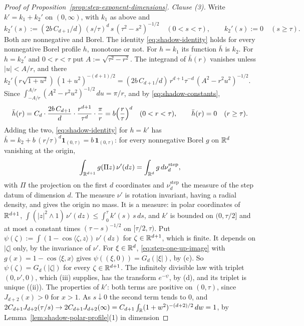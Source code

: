 \begin{proof}[Proof of Proposition~\ref{prop:step-exponent-dimensions}]
\emph{Clause (3).} Write $k' = k_1 + k_2'$ on $(0,\infty)$, with $k_1$ as above and
\[
  k_2'(s) := (2b\,C_{d+1}/d)\,(s/\tau)^d\,s\,(\tau^2 - s^2)^{-1/2} \quad (0 < s < \tau), \qquad
  k_2'(s) := 0 \quad (s \ge \tau) .
\]
Both are nonnegative and Borel. The identity
\ref{eq:shadow-identity} holds for every nonnegative Borel profile $h$, monotone or not. For
$h = k_1$ its function $\bar h$ is $k_2$. For $h = k_2'$ and $0 < r < \tau$ put
$A := \sqrt{\tau^2 - r^2}$. The integrand of $\bar h(r)$ vanishes unless $|u| < A/r$, and there
$k_2'(r\sqrt{1+u^2})\,(1+u^2)^{-(d+1)/2} = (2b\,C_{d+1}/d)\,r^{d+1}\tau^{-d}\,(A^2 - r^2u^2)^{-1/2}$.
Since $\int_{-A/r}^{A/r}(A^2 - r^2u^2)^{-1/2}\,du = \pi/r$, and by \ref{eq:shadow-constants},
\[
  \bar h(r) = C_d\cdot\frac{2b\,C_{d+1}}{d}\cdot\frac{r^{d+1}}{\tau^{d}}\cdot\frac{\pi}{r}
            = b\Bigl(\frac{r}{\tau}\Bigr)^{d} \quad (0 < r < \tau), \qquad
  \bar h(r) = 0 \quad (r \ge \tau) .
\]
Adding the two, \ref{eq:shadow-identity} for $h = k'$ has $\bar h = k_2 + b\,(r/\tau)^d
\mathbf 1_{(0,\tau)} = b\,\mathbf 1_{(0,\tau)}$: for every nonnegative Borel $g$ on $\mathbb{R}^d$
vanishing at the origin,
\begin{equation}\label{eq:step-one-up-image}
  \int_{\mathbb{R}^{d+1}} g(\Pi z)\,\nu'(dz) = \int_{\mathbb{R}^d} g\,d\nu^{\mathrm{step}}_d ,
\end{equation}
with $\Pi$ the projection on the first $d$ coordinates and $\nu^{\mathrm{step}}_d$ the \Levy{}
measure of the step datum of dimension $d$. The measure $\nu'$ is rotation invariant, having a
radial density, and gives the origin no mass. It is a \Levy{} measure: in polar coordinates of
$\mathbb{R}^{d+1}$, $\int(|z|^2 \wedge 1)\,\nu'(dz) \le \int_0^\tau k'(s)\,s\,ds$, and $k'$ is bounded
on $(0,\tau/2]$ and at most a constant times $(\tau - s)^{-1/2}$ on $[\tau/2,\tau)$. Put
$\psi(\zeta) := \int(1 - \cos\langle\zeta,z\rangle)\,\nu'(dz)$ for $\zeta \in \mathbb{R}^{d+1}$, which
is finite. It depends on $|\zeta|$ only, by the invariance of $\nu'$. For $\xi \in \mathbb{R}^d$,
\ref{eq:step-one-up-image} with $g(x) = 1 - \cos\langle\xi,x\rangle$ gives
$\psi((\xi,0)) = G_d(|\xi|)$, by (c). So $\psi(\zeta) = G_d(|\zeta|)$ for every
$\zeta \in \mathbb{R}^{d+1}$. The infinitely divisible law with triplet $(0,\nu',0)$, which
(iii) supplies, has the transform $e^{-\psi}$, by (d), and its triplet is unique ((ii)). The properties of $k'$: both terms are
positive on $(0,\tau)$, since $J_{d+2}(x) > 0$ for $x > 1$. As $s \downarrow 0$ the second term
tends to $0$, and $2C_{d+1}J_{d+2}(\tau/s) \to 2C_{d+1}J_{d+2}(\infty)
= C_{d+1}\int_{\mathbb{R}}(1+w^2)^{-(d+2)/2}\,dw = 1$, by Lemma~\ref{lem:shadow-polar-profile}(1) in dimension

\end{proof}
